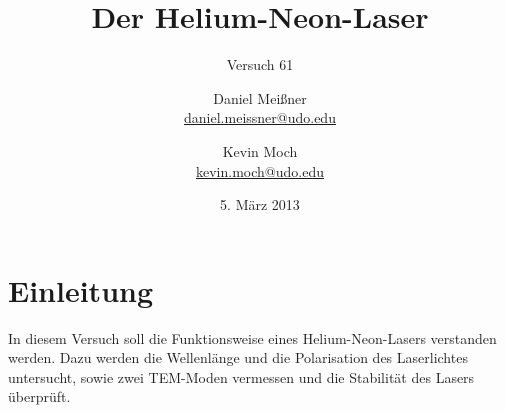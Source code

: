 

\newcommand{\name}[1]{\textsc{#1}}
\renewcommand{\d}{\ensuremath{\mathrm{d}}}

\titlehead{{TU Dortmund \hfill WS~13/14\\}
Fakultät Physik\\
Fortgeschrittenenpraktikum}

\subject{Versuchsprotokoll}
\title{Der Helium-Neon-Laser}
\subtitle{Versuch 61}

\author{Daniel Meißner\\
{\normalsize\url{daniel.meissner@udo.edu}}
\and
Kevin Moch\\
{\normalsize\url{kevin.moch@udo.edu}}}

\date{5. März 2013}


\maketitle

\tableofcontents
\clearpage

\section{Einleitung}
In diesem Versuch soll die Funktionsweise eines Helium-Neon-Lasers
verstanden werden. Dazu werden die Wellenlänge und die Polarisation 
des Laserlichtes untersucht, sowie zwei TEM-Moden vermessen und 
die Stabilität des Lasers überprüft.






\printbibliography
\nocite{v061}


